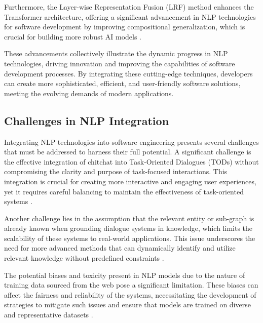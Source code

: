Furthermore, the Layer-wise Representation Fusion (LRF) method enhances the Transformer architecture, offering a significant advancement in NLP technologies for software development by improving compositional generalization, which is crucial for building more robust AI models \cite{zheng2023layerwiserepresentationfusioncompositional}.



These advancements collectively illustrate the dynamic progress in NLP technologies, driving innovation and improving the capabilities of software development processes. By integrating these cutting-edge techniques, developers can create more sophisticated, efficient, and user-friendly software solutions, meeting the evolving demands of modern applications.



\subsection{Challenges in NLP Integration} \label{subsec:Challenges in NLP Integration}



Integrating NLP technologies into software engineering presents several challenges that must be addressed to harness their full potential. A significant challenge is the effective integration of chitchat into Task-Oriented Dialogues (TODs) without compromising the clarity and purpose of task-focused interactions. This integration is crucial for creating more interactive and engaging user experiences, yet it requires careful balancing to maintain the effectiveness of task-oriented systems \cite{stricker2024enhancingtaskorienteddialogueschitchat}.



Another challenge lies in the assumption that the relevant entity or sub-graph is already known when grounding dialogue systems in knowledge, which limits the scalability of these systems to real-world applications. This issue underscores the need for more advanced methods that can dynamically identify and utilize relevant knowledge without predefined constraints \cite{chaudhuri2021groundingdialoguesystemsknowledge}.



The potential biases and toxicity present in NLP models due to the nature of training data sourced from the web pose a significant limitation. These biases can affect the fairness and reliability of the systems, necessitating the development of strategies to mitigate such issues and ensure that models are trained on diverse and representative datasets \cite{touvron2023llama}.



